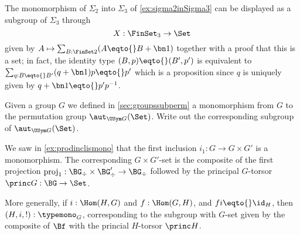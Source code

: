 %
  \begin{example}
    The monomorphism of $\Sigma_2$ into $\Sigma_3$ of \cref{ex:sigma2inSigma3} can be displayed as a subgroup of $\Sigma_3$ through
    $$X:\FinSet_3\to\Set
    $$
    given by $A\mapsto\sum_{B:\FinSet 2}(A\eqto{}B+\bn 1)$ together with a proof that this is a set; in fact, the identity type $(B,p)\eqto{}(B',p')$ is equivalent to $\sum_{q:B\eqto{}B'}(q+\bn 1)p\eqto{}p'$ which is a proposition since $q$ is uniquely given by $q+\bn 1\eqto{}p'p^{-1}$.
  \end{example}
  \begin{xca}
    Given a group $G$ we defined in \cref{sec:groupssubperm} a monomorphism from $G$ to the permutation group $\aut_{\USym G}(\Set)$. Write out the corresponding subgroup of $\aut_{\USym G}(\Set)$.
  \end{xca}
\begin{example}
  \label{ex:prodinclisGset}
  We saw in \cref{ex:prodinclismono} that the first inclusion $i_1:G\to G\times G'$ is a monomorphism.
  The corresponding $G\times G'$-set is the composite of the first projection $\mathrm{proj}_1:\BG_\div\times\BG'_\div\to \BG_\div$ followed by the principal $G$-torsor $\princ G:\BG\to\Set$.

  More generally, if $i:\Hom(H,G)$ and $f:\Hom(G,H)$, and $fi\eqto{}\id_H$, then $(H,i,!):\typemono_G$, corresponding to the subgroup with $G$-set given by the composite of $\Bf$ with the princial $H$-torsor $\princ H$.
\end{example}



